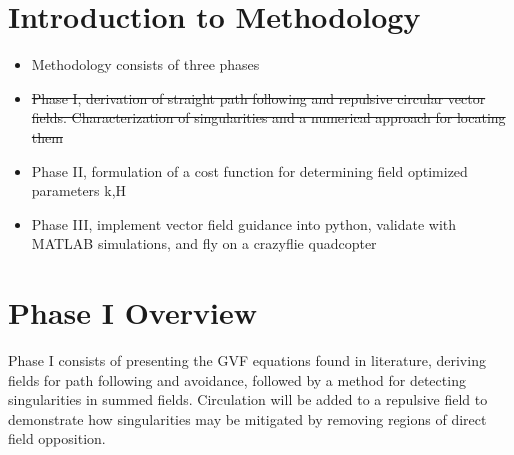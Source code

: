\documentclass[numbered,pdftex]{ohio-etd}
\begin{document}
%



\section{Introduction to Methodology}
\begin{itemize}
	\item Methodology consists of three phases
	\item \sout{Phase I, derivation of straight path following and repulsive circular vector fields. Characterization of singularities and a numerical approach for locating them}
	\item Phase II, formulation of a cost function for determining field optimized parameters k,H
	\item Phase III, implement vector field guidance into python, validate with MATLAB simulations, and fly on a crazyflie quadcopter
\end{itemize}
\section{Phase I Overview}

Phase I consists of presenting the GVF equations found in literature, deriving fields for path following and avoidance, followed by a method for detecting singularities in summed fields. Circulation will be added to a repulsive field to demonstrate how singularities may be mitigated by removing regions of direct field opposition.
\end{document}
